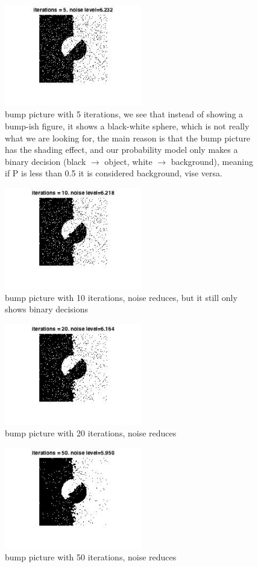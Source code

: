 \documentclass[twoside]{article}
\theoremstyle{definition}
\theoremstyle{definition}
\theoremstyle{remark}
\begin{document}
\begin{figure}[H]
\centering
\includegraphics[width=60mm]{5_bump.jpg}
\caption{bump picture with 5 iterations, we see that instead of showing a bump-ish figure, it shows a black-white sphere, which is not really what we are looking for, the main reason is that the bump picture has the shading effect, and our probability model only makes a binary decision (black $\rightarrow$ object, white $\rightarrow$ background), meaning if P is less than 0.5 it is considered background, vise versa. }
\end{figure}

\begin{figure}[H]
\centering
\includegraphics[width=60mm]{10_bump.jpg}
\caption{bump picture with 10 iterations, noise reduces, but it still only shows binary decisions}
\end{figure}

\begin{figure}[H]
\centering
\includegraphics[width=60mm]{20_bump.jpg}
\caption{bump picture with 20 iterations, noise reduces}
\end{figure}

\begin{figure}[H]
\centering
\includegraphics[width=60mm]{50_bump.jpg}
\caption{bump picture with 50 iterations, noise reduces}
\end{figure}
\end{document}
